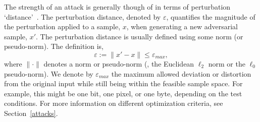 \label{perturbation_distance}
The strength of an attack is generally though of in terms of perturbation `distance'~\citep{croce_reliable_2020,chakraborty_adversarial_2018,pixelattack}. The perturbation distance, denoted by $\varepsilon$, quantifies the magnitude of the perturbation applied to a sample, $x$, when generating a new adversarial sample, $x'$. The perturbation distance is usually defined using some norm (or pseudo-norm). The definition is,
\[
    \varepsilon := \| x' - x \| \leq \varepsilon_{max},
\]
where $\| \cdot \|$ denotes a norm or pseudo-norm (\eg, the Euclidean $\ell_2$ norm or the $\ell_0$ pseudo-norm). We denote by $\varepsilon_{max}$ the maximum allowed deviation or distortion from the original input while still being within the feasible sample space. For example, this might be one bit, one pixel, or one byte, depending on the test conditions. For more information on different optimization criteria, see Section~\ref{attacks}.


